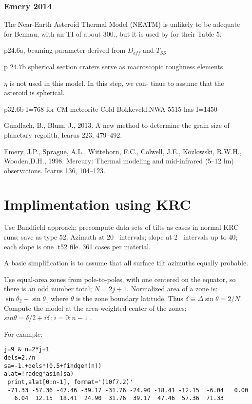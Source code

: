 \documentclass{article}
\begin{document}
\subsubsection{Emery 2014}
The Near-Earth Asteroid Thermal Model (NEATM)  is unlikely to be
adequate for Bennau, with an TI of about 300., but it is used by 
for their Table 5.

p24.6a, beaming parameter derived from $D_{eff}$ and $T_{SS}$

p 24.7b spherical section craters serve as macroscopic roughness elements 

$\eta$ is not used in this model. In this step, we con-
tinue to assume that the asteroid is spherical.

p32.6b I=768 for  CM meteorite Cold Bokkeveld.NWA 5515 has I=1450 

Gundlach, B., Blum, J., 2013. A new method to determine the grain size of planetary regolith. Icarus 223, 479–492.


Emery, J.P., Sprague, A.L., Witteborn, F.C., Colwell, J.E., Kozlowski, R.W.H.,
Wooden,D.H., 1998. Mercury: Thermal modeling and mid-infrared (5–12 lm)
observations. Icarus 136, 104–123.


\section{Implimentation using KRC}
Use Bandfield approach; precompute data sets of tilts as cases in
normal KRC runs; save as type 52. Azimuth at 20\qd~ intervals; slope at 2\qd~
intervals up to 40\qd; each slope is one .t52 file. 361 cases per material.

A basic simplification is to assume that all surface tilt azimuths equally probable.
 
Use equal-area zones from pole-to-poles, with one centered on the equator, so
there is an odd number total; $N=2j+1$.  Normalized area of a zone is: $\sin
\theta_2 - \sin \theta_1$ where $\theta$ is the zone boundary latitude. Thus
$\delta \equiv \Delta \sin \theta = 2/N $.  Compute the model at the
area-weighted center of the zones; $sin \theta= \delta/2+i \delta \ ; i=0:n-1$ .

 For example:
\begin{verbatim}
j=9 & n=2*j+1
dels=2./n
sa=-1.+dels*(0.5+findgen(n))
alat=!radeg*asin(sa)
 print,alat[0:n-1], format='(10f7.2)'
 -71.33 -57.36 -47.46 -39.17 -31.76 -24.90 -18.41 -12.15  -6.04   0.00
   6.04  12.15  18.41  24.90  31.76  39.17  47.46  57.36  71.33  
\end{verbatim}
\end{document}
